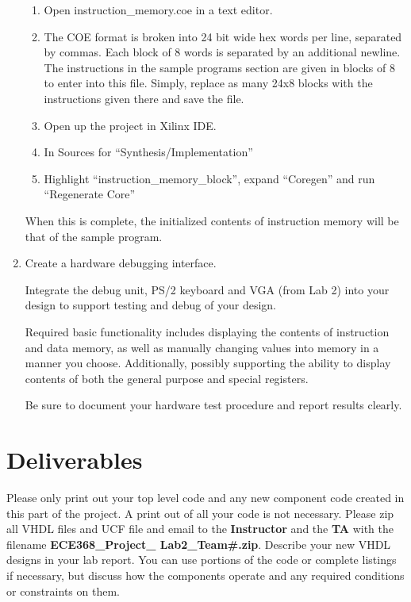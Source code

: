 \documentclass{article}
\begin{document}
\begin{enumerate}
\begin{enumerate}
  \item Open instruction\_memory.coe in a text editor.
  \item The COE format is broken into 24 bit wide hex words per line, separated by commas. Each block of 8 words is separated by an additional newline. The instructions in the sample programs section are given in blocks of 8 to enter into this file. Simply, replace as many 24x8 blocks with the instructions given there and save the file.
  \item Open up the project in Xilinx IDE.
  \item In Sources for “Synthesis/Implementation” 
  \item Highlight “instruction\_memory\_block”, expand “Coregen” and run “Regenerate Core”
\end{enumerate}

When this is complete, the initialized contents of instruction memory will be that of the sample program.

\item Create a hardware debugging interface. 

Integrate the debug unit, PS/2 keyboard and VGA (from Lab 2) into your design to support testing and debug of your design.

Required basic functionality includes displaying the contents of instruction and data memory, as well as manually changing values into memory in a manner you choose. Additionally, possibly supporting the ability to display contents of both the general purpose and special registers.

Be sure to document your hardware test procedure and report results clearly.

\end{enumerate}

\section{Deliverables}

Please only print out your top level code and any new component code created in this part of the project. A print out of all your code is not necessary. Please zip all VHDL files and UCF file and email to the \textbf{Instructor} and the \textbf{TA} with the filename \textbf{ECE368\_Project\_ Lab2\_Team\#.zip}. Describe your new VHDL designs in your lab report. You can use portions of the code or complete listings if necessary, but discuss how the components operate and any required conditions or constraints on them.
\end{document}
